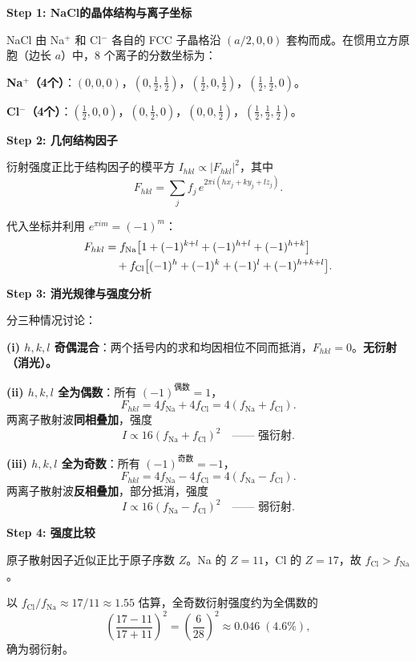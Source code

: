 \begin{derivationbox}[标准解题过程]
\textbf{Step 1: NaCl的晶体结构与离子坐标}

NaCl 由 Na$^+$ 和 Cl$^-$ 各自的 FCC 子晶格沿 $(a/2,0,0)$ 套构而成。在惯用立方原胞（边长 $a$）中，8 个离子的分数坐标为：

\textbf{Na$^+$（4个）}：$(0,0,0)$，$(0,\tfrac12,\tfrac12)$，$(\tfrac12,0,\tfrac12)$，$(\tfrac12,\tfrac12,0)$。

\textbf{Cl$^-$（4个）}：$(\tfrac12,0,0)$，$(0,\tfrac12,0)$，$(0,0,\tfrac12)$，$(\tfrac12,\tfrac12,\tfrac12)$。

\textbf{Step 2: 几何结构因子}

衍射强度正比于结构因子的模平方 $I_{hkl}\propto|F_{hkl}|^2$，其中
\begin{equation}
F_{hkl}=\sum_j f_j\,e^{2\pi i(hx_j+ky_j+lz_j)}.
\end{equation}

代入坐标并利用 $e^{\pi im}=(-1)^m$：
\begin{align}
F_{hkl}&=f_{\text{Na}}\bigl[1+(-1)^{k+l}+(-1)^{h+l}+(-1)^{h+k}\bigr]\notag\\
&\quad+f_{\text{Cl}}\bigl[(-1)^h+(-1)^k+(-1)^l+(-1)^{h+k+l}\bigr].
\end{align}

\textbf{Step 3: 消光规律与强度分析}

分三种情况讨论：

\textbf{(i) $h,k,l$ 奇偶混合}：两个括号内的求和均因相位不同而抵消，$F_{hkl}=0$。\textbf{无衍射（消光）。}

\textbf{(ii) $h,k,l$ 全为偶数}：所有 $(-1)^{\text{偶数}}=1$，
\begin{equation}
F_{hkl}=4f_{\text{Na}}+4f_{\text{Cl}}=4(f_{\text{Na}}+f_{\text{Cl}}).
\end{equation}
两离子散射波\textbf{同相叠加}，强度
\begin{equation}
I\propto16(f_{\text{Na}}+f_{\text{Cl}})^2\quad\text{—— 强衍射}.
\end{equation}

\textbf{(iii) $h,k,l$ 全为奇数}：所有 $(-1)^{\text{奇数}}=-1$，
\begin{equation}
F_{hkl}=4f_{\text{Na}}-4f_{\text{Cl}}=4(f_{\text{Na}}-f_{\text{Cl}}).
\end{equation}
两离子散射波\textbf{反相叠加}，部分抵消，强度
\begin{equation}
I\propto16(f_{\text{Na}}-f_{\text{Cl}})^2\quad\text{—— 弱衍射}.
\end{equation}

\textbf{Step 4: 强度比较}

原子散射因子近似正比于原子序数 $Z$。Na 的 $Z=11$，Cl 的 $Z=17$，故 $f_{\text{Cl}}>f_{\text{Na}}$。

以 $f_{\text{Cl}}/f_{\text{Na}}\approx17/11\approx1.55$ 估算，全奇数衍射强度约为全偶数的
\begin{equation}
\left(\frac{17-11}{17+11}\right)^2=\left(\frac{6}{28}\right)^2\approx0.046\;(4.6\%),
\end{equation}
确为弱衍射。
\end{derivationbox}

